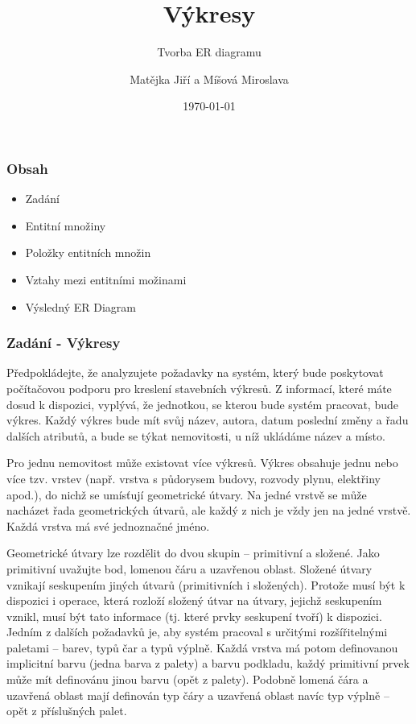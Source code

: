 \documentclass{beamer}
\title{Výkresy}
\subtitle{Tvorba ER diagramu}
\author{Matějka Jiří a Míšová Miroslava}
\date{\today}
\begin{document}
  \frame{\titlepage}
  \begin{frame}
    \frametitle{Obsah}

    \begin{itemize}
      \item Zadání
      \item Entitní množiny
      \item Položky entitních množin
      \item Vztahy mezi entitními možinami
      \item Výsledný ER Diagram
    \end{itemize}
  \end{frame}
  \begin{frame}
    \frametitle{Zadání - Výkresy}
    \hspace{2mm}
      \scriptsize{
      Předpokládejte, že analyzujete požadavky na systém, který bude poskytovat počítačovou
      podporu pro kreslení stavebních výkresů. Z informací, které máte dosud k dispozici,
      vyplývá, že jednotkou, se kterou bude systém pracovat, bude výkres. Každý výkres bude
      mít svůj název, autora, datum poslední změny a řadu dalších atributů, a bude se týkat
      nemovitosti, u níž ukládáme název a místo.\par


      \hspace{0.5cm}Pro jednu nemovitost může existovat více výkresů. Výkres obsahuje jednu nebo více tzv.
      vrstev (např. vrstva s půdorysem budovy, rozvody plynu, elektřiny apod.), do nichž se
      umísťují geometrické útvary. Na jedné vrstvě se může nacházet řada geometrických útvarů,
      ale každý z nich je vždy jen na jedné vrstvě. Každá vrstva má své jednoznačné jméno.\par


      \hspace{0.5cm}Geometrické útvary lze rozdělit do dvou skupin -- primitivní a složené. Jako primitivní
      uvažujte bod, lomenou čáru a uzavřenou oblast. Složené útvary vznikají seskupením jiných
      útvarů (primitivních i složených). Protože musí být k dispozici i operace, která rozloží
      složený útvar na útvary, jejichž seskupením vznikl, musí být tato informace (tj. které
      prvky seskupení tvoří) k dispozici. Jedním z dalších požadavků je, aby systém pracoval
      s určitými rozšířitelnými paletami -- barev, typů čar a typů výplně. Každá vrstva má
      potom definovanou implicitní barvu (jedna barva  z  palety) a barvu podkladu, každý
      primitivní prvek může mít definovánu jinou barvu (opět z palety). Podobně lomená čára
      a uzavřená oblast mají definován typ čáry a uzavřená oblast navíc typ výplně – opět
      z příslušných palet.\par}

  \end{frame}
\end{document}
